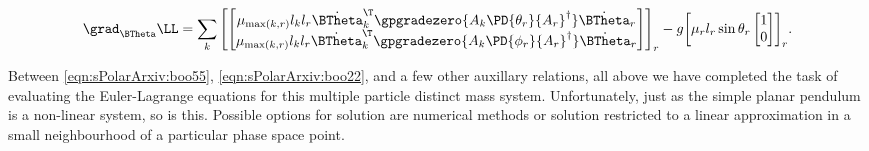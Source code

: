 \begin{align}\label{eqn:sPolarArxiv:boo55}
\grad_{\BTheta} \LL =
\sum_k
{\begin{bmatrix}
\begin{bmatrix}
\mu_{\max(k,r)} l_k l_r {\dot{\BTheta}_k}^\T \gpgradezero{ A_k \PD{\theta_r}{A_r}^\dagger } \dot{\BTheta}_r \\
\mu_{\max(k,r)} l_k l_r {\dot{\BTheta}_k}^\T \gpgradezero{ A_k \PD{\phi_r}{A_r}^\dagger } \dot{\BTheta}_r 
\end{bmatrix}
\end{bmatrix}}_r
- g
{\begin{bmatrix}
\mu_r l_r \sin\theta_r 
\begin{bmatrix}
1 \\
0
\end{bmatrix}
\end{bmatrix}}_r.
\end{align}

Between \ref{eqn:sPolarArxiv:boo55}, \ref{eqn:sPolarArxiv:boo22}, and a few other auxillary relations, all above we have completed the task of evaluating the Euler-Lagrange equations for this multiple particle distinct mass system.  Unfortunately, just as the simple planar pendulum is a non-linear system, so is this.  Possible options for solution are numerical methods or solution restricted to a linear approximation in a small neighbourhood of a particular phase space point.  
\EndArticle
